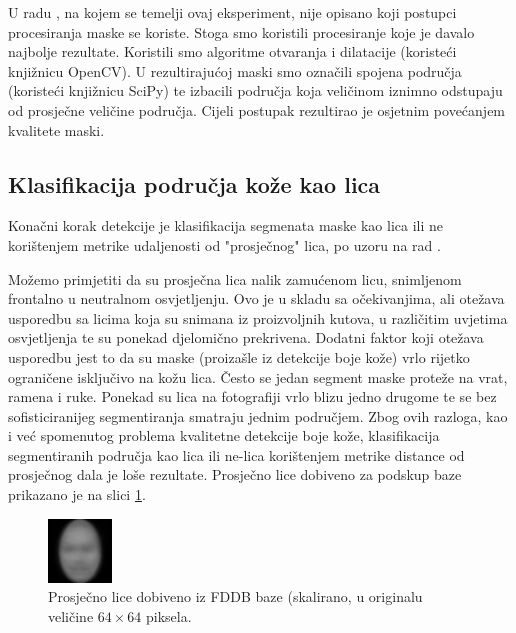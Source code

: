 \documentclass[times, utf8, seminar, numeric]{fer}
\begin{document}
U radu \cite{conf/isda/ChandrappaR12}, na kojem se
temelji ovaj eksperiment, nije opisano koji postupci procesiranja maske se koriste. Stoga smo
koristili procesiranje koje je davalo najbolje rezultate. Koristili smo algoritme otvaranja i
dilatacije (koristeći knjižnicu OpenCV). U rezultirajućoj maski smo označili spojena područja
(koristeći knjižnicu SciPy) te izbacili područja koja veličinom iznimno odstupaju od prosječne
veličine područja. Cijeli postupak rezultirao je osjetnim povećanjem kvalitete maski.

\subsection{Klasifikacija područja kože kao lica}

Konačni korak detekcije je klasifikacija segmenata maske kao lica ili ne korištenjem
metrike udaljenosti od "prosječnog" lica, po uzoru na rad \cite{conf/isda/ChandrappaR12}.


Možemo primjetiti da su prosječna lica nalik zamućenom licu, snimljenom frontalno u neutralnom osvjetljenju.
Ovo je u skladu sa očekivanjima, ali otežava usporedbu sa licima koja su snimana iz proizvoljnih kutova,
u različitim uvjetima osvjetljenja te su ponekad djelomično prekrivena. Dodatni faktor koji otežava usporedbu
jest to da su maske (proizašle iz detekcije boje kože) vrlo rijetko ograničene isključivo na kožu lica. Često
se jedan segment maske proteže na vrat, ramena i ruke. Ponekad su lica na fotografiji vrlo blizu jedno drugome
te se bez sofisticiranijeg segmentiranja smatraju jednim područjem.
Zbog ovih razloga, kao i već spomenutog problema kvalitetne detekcije boje kože, klasifikacija segmentiranih
područja kao lica ili ne-lica korištenjem metrike distance od prosječnog dala je loše rezultate. Prosječno
lice dobiveno za podskup baze prikazano je na slici \ref{fig:fddb_avg_face}.

\begin{figure}[!htb]
\centering
\includegraphics[width=0.4 \textwidth]{raw/avg_face.png}
\caption{Prosječno lice dobiveno iz FDDB baze (skalirano, u originalu veličine $64 \times 64$ piksela.}
\label{fig:fddb_avg_face}
\end{figure}
\end{document}
